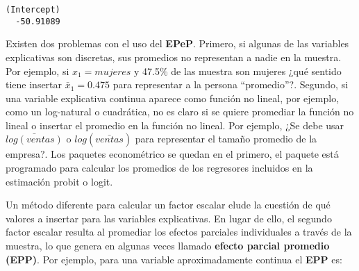 \documentclass[
  letterpaper,
  DIV=11,
  numbers=noendperiod]{scrreprt}
\newenvironment{Shaded}{\begin{snugshade}}{\end{snugshade}}
\newcommand{\CommentTok}[1]{\textcolor[rgb]{0.37,0.37,0.37}{#1}}
\newcommand{\ControlFlowTok}[1]{\textcolor[rgb]{0.00,0.23,0.31}{\textbf{#1}}}
\newcommand{\DecValTok}[1]{\textcolor[rgb]{0.68,0.00,0.00}{#1}}
\newcommand{\FunctionTok}[1]{\textcolor[rgb]{0.28,0.35,0.67}{#1}}
\newcommand{\NormalTok}[1]{\textcolor[rgb]{0.00,0.23,0.31}{#1}}
\newcommand{\OtherTok}[1]{\textcolor[rgb]{0.00,0.23,0.31}{#1}}
\newcommand{\SpecialCharTok}[1]{\textcolor[rgb]{0.37,0.37,0.37}{#1}}
\begin{document}
\begin{Shaded}
\end{Shaded}

\begin{verbatim}
(Intercept) 
  -50.91089 
\end{verbatim}

Existen dos problemas con el uso del \textbf{EPeP}. Primero, si algunas
de las variables explicativas son discretas, sus promedios no
representan a nadie en la muestra. Por ejemplo, si \(x_1=mujeres\) y
47.5\% de las muestra son mujeres ¿qué sentido tiene insertar
\(\bar{x}_1=0.475\) para representar a la persona ``promedio''?.
Segundo, si una variable explicativa continua aparece como función no
lineal, por ejemplo, como un log-natural o cuadrática, no es claro si se
quiere promediar la función no lineal o insertar el promedio en la
función no lineal. Por ejemplo, ¿Se debe usar \(\bar{log(ventas)}\) o
\(log(\bar{ventas})\) para representar el tamaño promedio de la
empresa?. Los paquetes econométrico se quedan en el primero, el paquete
está programado para calcular los promedios de los regresores incluidos
en la estimación probit o logit.

Un método diferente para calcular un factor escalar elude la cuestión de
qué valores a insertar para las variables explicativas. En lugar de
ello, el segundo factor escalar resulta al promediar los efectos
parciales individuales a través de la muestra, lo que genera en algunas
veces llamado \textbf{efecto parcial promedio (EPP)}. Por ejemplo, para
una variable aproximadamente continua el \textbf{EPP} es:
\end{document}

